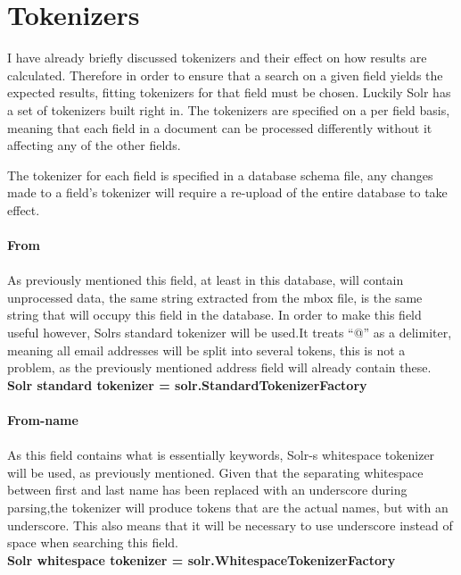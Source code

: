 \documentclass{report}
\begin{document}
\section{Tokenizers}

I have already briefly discussed tokenizers and their effect on how results are calculated. Therefore in order to ensure that a search on a given field yields the expected results, fitting tokenizers for that field must be chosen. Luckily Solr has a set of tokenizers built right in. The tokenizers are specified on a per field basis, meaning that each field in a document can be processed differently without it affecting any of the other fields.

The tokenizer for each field is specified in a database schema file, any changes made to a field's tokenizer will require a re-upload of the entire database to take effect.\\\\

\noindent
\textbf{From}\\\\
As previously mentioned this field, at least in this database, will contain unprocessed data, the same string extracted from the mbox file, is the same string that will occupy this field in the database. In order to make this field useful however, Solrs standard tokenizer will be used.It treats “@” as a delimiter, meaning all email addresses will be split into several tokens, this is not a problem, as the previously mentioned address field will already contain these.\\

\textbf{Solr standard tokenizer = solr.StandardTokenizerFactory}\\\\

\noindent
\textbf{From-name}\\\\
As this field contains what is essentially keywords, Solr-s whitespace tokenizer will be used, as previously mentioned. Given that the separating whitespace between first and last name has been replaced with an underscore during parsing,the tokenizer will produce tokens that are the actual names, but with an underscore. This also means that it will be necessary to use underscore instead of space when searching this field.\\

\textbf{Solr whitespace tokenizer = solr.WhitespaceTokenizerFactory}\\\\
\end{document}
